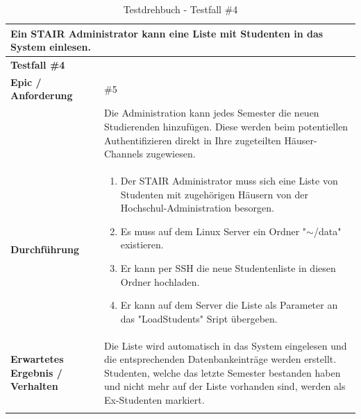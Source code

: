 \documentclass[a4paper, table]{article}
\begin{document}
\begin{longtable}[h]{|p{15em}|p{25em}|}
    \hline
    \multicolumn{2}{|l|}{\textbf{Ein STAIR Administrator kann eine Liste mit Studenten in das System einlesen.}} \\
    \hline
    \multicolumn{2}{|l|}{\textbf{Testfall \#4}} \\
    \hline
    \textbf{Epic / Anforderung} & \#5 \\*
     & Die Administration kann jedes Semester die neuen Studierenden hinzufügen.
     Diese werden beim potentiellen Authentifizieren direkt in Ihre zugeteilten Häuser-Channels zugewiesen. \\
    \hline
    \textbf{Durchführung} &
    \begin{enumerate}
        \item Der STAIR Administrator muss sich eine Liste von Studenten mit zugehörigen Häusern von der Hochschul-Administration besorgen.
        \item Es muss auf dem Linux Server ein Ordner "$\mathtt{\sim}$/data" existieren.
        \item Er kann per SSH die neue Studentenliste in diesen Ordner hochladen.
        \item Er kann auf dem Server die Liste als Parameter an das "LoadStudents" Sript übergeben.
    \end{enumerate}\\
    \hline
    \textbf{Erwartetes Ergebnis / Verhalten} & Die Liste wird automatisch in das System eingelesen und die entsprechenden Datenbankeinträge werden erstellt.
    Studenten, welche das letzte Semester bestanden haben und nicht mehr auf der Liste vorhanden sind, werden als Ex-Studenten markiert.\\
    \hline
    \caption{Testdrehbuch - Testfall \#4}
\end{longtable}
\end{document}
